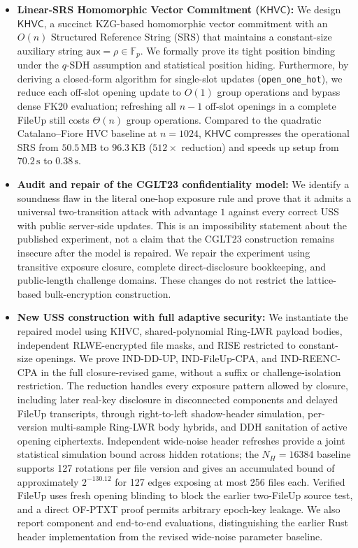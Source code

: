 \begin{itemize}
    \item \textbf{Linear-SRS Homomorphic Vector Commitment ($\mathsf{KHVC}$):} 
    We design $\mathsf{KHVC}$, a succinct KZG-based homomorphic vector commitment with an $O(n)$ Structured Reference String (SRS) that maintains a constant-size auxiliary string $\mathsf{aux} = \rho \in \mathbb{F}_p$. We formally prove its tight position binding under the $q$-SDH assumption and statistical position hiding. Furthermore, by deriving a closed-form algorithm for single-slot updates (\texttt{open\_one\_hot}), we reduce each off-slot opening update to $O(1)$ group operations and bypass dense FK20 evaluation; refreshing all $n-1$ off-slot openings in a complete FileUp still costs $\Theta(n)$ group operations. Compared to the quadratic Catalano--Fiore HVC baseline at $n = 1024$, $\mathsf{KHVC}$ compresses the operational SRS from $50.5\,\text{MB}$ to $96.3\,\text{KB}$ ($512\times$ reduction) and speeds up setup from $70.2\,\text{s}$ to $0.38\,\text{s}$.

    \item \textbf{Audit and repair of the CGLT23 confidentiality model:}
    We identify a soundness flaw in the literal one-hop exposure rule and prove that it admits a universal two-transition attack with advantage $1$ against every correct USS with public server-side updates. This is an impossibility statement about the published experiment, not a claim that the CGLT23 construction remains insecure after the model is repaired. We repair the experiment using transitive exposure closure, complete direct-disclosure bookkeeping, and public-length challenge domains. These changes do not restrict the lattice-based bulk-encryption construction.

    \item \textbf{New USS construction with full adaptive security:}
    We instantiate the repaired model using KHVC, shared-polynomial Ring-LWR payload bodies, independent RLWE-encrypted file masks, and RISE restricted to constant-size openings. We prove IND-DD-UP, IND-FileUp-CPA, and IND-REENC-CPA in the full closure-revised game, without a suffix or challenge-isolation restriction. The reduction handles every exposure pattern allowed by closure, including later real-key disclosure in disconnected components and delayed FileUp transcripts, through right-to-left shadow-header simulation, per-version multi-sample Ring-LWR body hybrids, and DDH sanitation of active opening ciphertexts. Independent wide-noise header refreshes provide a joint statistical simulation bound across hidden rotations; the $N_H=16384$ baseline supports 127 rotations per file version and gives an accumulated bound of approximately $2^{-130.12}$ for 127 edges exposing at most 256 files each. Verified FileUp uses fresh opening blinding to block the earlier two-FileUp source test, and a direct OF-PTXT proof permits arbitrary epoch-key leakage. We also report component and end-to-end evaluations, distinguishing the earlier Rust header implementation from the revised wide-noise parameter baseline.

\end{itemize}



